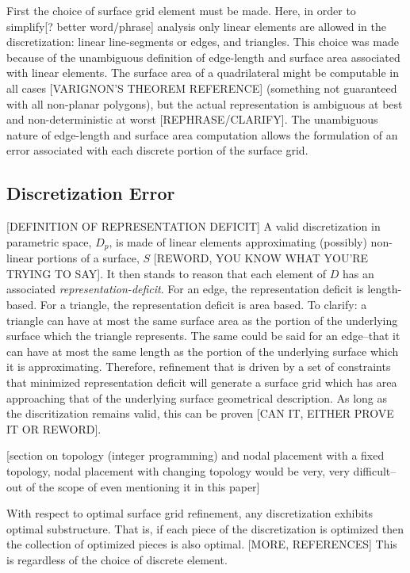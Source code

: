 \documentclass[11pt]{article}
\begin{document}
First the choice of surface grid element must be made. Here, in order to simplify[? better word/phrase] analysis only linear elements are allowed in the discretization: linear line-segments or edges, and triangles. This choice was made because of the unambiguous definition of edge-length and surface area associated with linear elements. The surface area of a quadrilateral might be computable in all cases [VARIGNON'S THEOREM REFERENCE] (something not guaranteed with all non-planar polygons), but the actual representation is ambiguous at best and non-deterministic at worst [REPHRASE/CLARIFY]. The unambiguous nature of edge-length and surface area computation allows the formulation of an error associated with each discrete portion of the surface grid.

\subsection{Discretization Error}
[DEFINITION OF REPRESENTATION DEFICIT] A valid discretization in parametric space, $D_p$, is made of linear elements approximating (possibly) non-linear portions of a surface, $S$ [REWORD, YOU KNOW WHAT YOU'RE TRYING TO SAY]. It then stands to reason that each element of $D$ has an associated {\it representation-deficit}. For an edge, the representation deficit is length-based. For a triangle, the representation deficit is area based. To clarify: a triangle can have at most the same surface area as the portion of the underlying surface which the triangle represents. The same could be said for an edge--that it can have at most the same length as the portion of the underlying surface which it is approximating. Therefore, refinement that is driven by a set of constraints that minimized representation deficit will generate a surface grid which has area approaching that of the underlying surface geometrical description. As long as the discritization remains valid, this can be proven [CAN IT, EITHER PROVE IT OR REWORD].

[section on topology (integer programming) and nodal placement with a fixed topology, nodal placement with changing topology would be very, very difficult--out of the scope of even mentioning it in this paper]

With respect to optimal surface grid refinement, any discretization exhibits optimal substructure. That is, if each piece of the discretization is optimized then the collection of optimized pieces is also optimal. [MORE, REFERENCES] This is regardless of the choice of discrete element.
\end{document}
